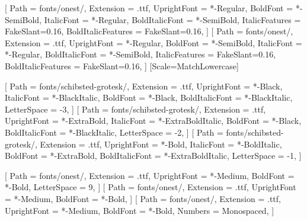 

\setmainfont{Onest}[
  Path           = fonts/onest/,
  Extension      = .ttf,
  UprightFont    = *-Regular,
  BoldFont       = *-SemiBold,
  ItalicFont     = *-Regular,
  BoldItalicFont = *-SemiBold,
  ItalicFeatures     = {FakeSlant=0.16},
  BoldItalicFeatures = {FakeSlant=0.16},
]
\setsansfont{Onest}[
  Path           = fonts/onest/,
  Extension      = .ttf,
  UprightFont    = *-Regular,
  BoldFont       = *-SemiBold,
  ItalicFont     = *-Regular,
  BoldItalicFont = *-SemiBold,
  ItalicFeatures     = {FakeSlant=0.16},
  BoldItalicFeatures = {FakeSlant=0.16},
]
  {\setmonofont{DejaVu Sans Mono}[Scale=MatchLowercase]}
  {\setmonofont{Latin Modern Mono}}

\newfontfamily{}[
  Path = fonts/schibsted-grotesk/, Extension = .ttf,
  UprightFont = *-Black,     ItalicFont = *-BlackItalic,
  BoldFont    = *-Black,     BoldItalicFont = *-BlackItalic,
  LetterSpace = -3,
]
\newfontfamily{}[
  Path = fonts/schibsted-grotesk/, Extension = .ttf,
  UprightFont = *-ExtraBold, ItalicFont = *-ExtraBoldItalic,
  BoldFont    = *-Black,     BoldItalicFont = *-BlackItalic,
  LetterSpace = -2,
]
\newfontfamily{}[
  Path = fonts/schibsted-grotesk/, Extension = .ttf,
  UprightFont = *-Bold,      ItalicFont = *-BoldItalic,
  BoldFont    = *-ExtraBold, BoldItalicFont = *-ExtraBoldItalic,
  LetterSpace = -1,
]

\newfontfamily{}[
  Path = fonts/onest/, Extension = .ttf,
  UprightFont = *-Medium, BoldFont = *-Bold,
  LetterSpace = 9,
]
\newfontfamily{}[
  Path = fonts/onest/, Extension = .ttf,
  UprightFont = *-Medium, BoldFont = *-Bold,
]
\newfontfamily{}[
  Path = fonts/onest/, Extension = .ttf,
  UprightFont = *-Medium, BoldFont = *-Bold,
  Numbers = Monospaced,
]

